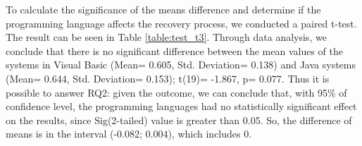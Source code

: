 \documentclass{sig-alternate-05-2015}
\begin{document}
To calculate the significance of the means difference and determine if the programming language affects the recovery process, we conducted a paired t-test. The result can be seen in Table \ref{table:test_t3}. Through data analysis, we conclude that there is no significant difference between the mean values of the systems in Visual Basic (Mean= 0.605,  Std. Deviation= 0.138) and Java systems (Mean= 0.644,  Std. Deviation= 0.153); t(19)= -1.867, p= 0.077. Thus it is possible to answer RQ2: given the outcome, we can conclude that, with 95\% of confidence level, the programming languages had no statistically significant effect on the results, since Sig(2-tailed) value is greater than 0.05. So, the difference of means is in the interval (-0.082; 0.004), which includes 0.

\begin{table}[h]
	\centering
	\caption{Paired t-test for the comparison of the two programming languages.}
	\label{table:test_t3}
\end{table}
\end{document}
